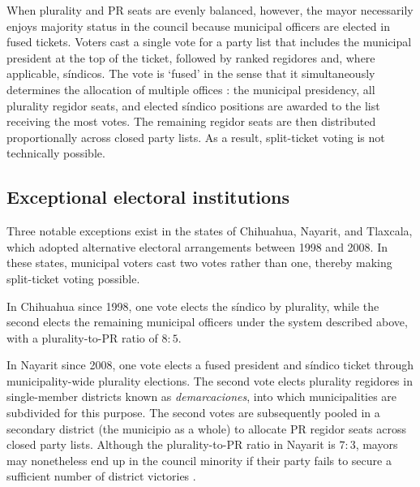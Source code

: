 \documentclass[letter,12pt]{article}
\begin{document}
When plurality and PR seats are evenly balanced, however, the mayor necessarily enjoys majority status in the council because municipal officers are elected in fused tickets. Voters cast a single vote for a party list that includes the municipal president at the top of the ticket, followed by ranked regidores and, where applicable, síndicos. The vote is `fused' in the sense that it simultaneously determines the allocation of multiple offices \citep[see ][:42]{cox.1997}: the municipal presidency, all plurality regidor seats, and elected síndico positions are awarded to the list receiving the most votes. The remaining regidor seats are then distributed proportionally across closed party lists. As a result, split-ticket voting is not technically possible.

\subsection{Exceptional electoral institutions}
Three notable exceptions exist in the states of Chihuahua, Nayarit, and Tlaxcala, which adopted alternative electoral arrangements between 1998 and 2008. In these states, municipal voters cast two votes rather than one, thereby making split-ticket voting possible.

In Chihuahua since 1998, one vote elects the síndico by plurality, while the second elects the remaining municipal officers under the system described above, with a plurality-to-PR ratio of $8:5$.

In Nayarit since 2008, one vote elects a fused president and síndico ticket through municipality-wide plurality elections. The second vote elects plurality regidores in single-member districts known as \emph{demarcaciones}, into which municipalities are subdivided for this purpose. The second votes are subsequently pooled in a secondary district (the municipio as a whole) to allocate PR regidor seats across closed party lists. Although the plurality-to-PR ratio in Nayarit is $7:3$, mayors may nonetheless end up in the council minority if their party fails to secure a sufficient number of district victories \citep{lucardi.magar.2019}.
\end{document}
